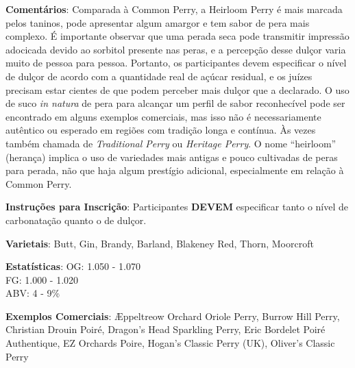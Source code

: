 \textbf{Comentários}: Comparada à Common Perry, a Heirloom Perry é mais marcada pelos taninos, pode apresentar algum amargor e tem sabor de pera mais complexo. É importante observar que uma perada seca pode transmitir impressão adocicada devido ao sorbitol presente nas peras, e a percepção desse dulçor varia muito de pessoa para pessoa. Portanto, os participantes devem especificar o nível de dulçor de acordo com a quantidade real de açúcar residual, e os juízes precisam estar cientes de que podem perceber mais dulçor que a declarado. O uso de suco \textit{in natura} de pera para alcançar um perfil de sabor reconhecível pode ser encontrado em alguns exemplos comerciais, mas isso não é necessariamente autêntico ou esperado em regiões com tradição longa e contínua. Às vezes também chamada de \textit{Traditional Perry} ou \textit{Heritage Perry}. O nome “heirloom” (herança) implica o uso de variedades mais antigas e pouco cultivadas de peras para perada, não que haja algum prestígio adicional, especialmente em relação à Common Perry.

\textbf{Instruções para Inscrição}: Participantes \textbf{DEVEM} especificar tanto o nível de carbonatação quanto o de dulçor.

\textbf{Varietais}: Butt, Gin, Brandy, Barland, Blakeney Red, Thorn, Moorcroft

\textbf{Estatísticas}: OG: 1.050 - 1.070 \\
\phantom{ } \hspace{16.5mm} FG: 1.000 - 1.020 \\
\phantom{ } \hspace{16.5mm} ABV: 4 - 9\%

\textbf{Exemplos Comerciais}: Æppeltreow Orchard Oriole Perry, Burrow Hill Perry, Christian Drouin Poiré, Dragon's Head Sparkling Perry, Eric Bordelet Poiré Authentique, EZ Orchards Poire, Hogan's Classic Perry (UK), Oliver's Classic Perry
